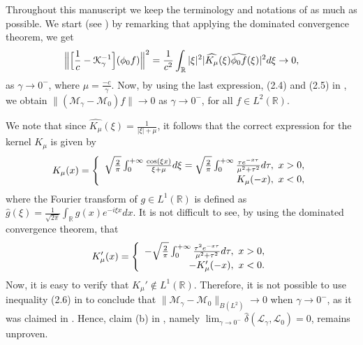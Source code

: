 \documentclass[10pt,reqno]{amsart}
\numberwithin{equation}{section}
\begin{document}

Throughout this manuscript we keep the terminology and notations of 
\cite{am:am} as much as possible.  We start (see \cite[Lemma 2.4, p. 188]{am:am})  
by remarking that applying the dominated convergence theorem, we get
\begin{equation*}
 \Big{\|}\Big{[}\frac{1}{c}-\mathcal{K}_{\gamma}^{-1}\Big{]} (\phi_0 f) 
 \Big{\|}^2 = \frac{1}{c^2} \int_{\mathbb{R}} |\xi|^2
 |\widehat{K_{\mu}}(\xi) \widehat{\phi_0 f}(\xi)|^2 d\xi 
 \rightarrow 0,
\end{equation*}
as $\gamma \rightarrow 0^-$, where $\mu=\frac{-c}{\gamma}$.   Now, by 
using the last expression, (2.4) and (2.5) in \cite{am:am}, we obtain   
$\|(\mathcal{M}_{\gamma}-\mathcal{M}_0)f\|\rightarrow 0$ as 
$\gamma \rightarrow 0^{-}$, for all $f \in L^2(\mathbb{R})$.

We note that since  $\widehat{K_{\mu}}(\xi)=\frac{1}{|\xi|+\mu}$, 
it follows that the correct expression for the kernel $K_{\mu}$ is 
given by 
\begin{equation*}
 K_{\mu}(x)  =\left\{
  \begin{array}
  [c]{r}
  \sqrt{\frac{2}{\pi}} \int_0^{+\infty}\frac{\cos(\xi x)}
  {\xi+\mu} d\xi =
  \sqrt{\frac{2}{\pi}} \int_0^{+\infty}\frac{\tau e^{-x\tau}}
  {\mu^2+\tau^2}d\tau,\text{ }x>0,\\
  K_{\mu}(-x),\text{ }x<0,
  \end{array}
\right.
\end{equation*}
where the Fourier transform of $g \in L^1(\mathbb{R})$ is 
defined as $\hat g(\xi)=\frac{1}{\sqrt{2\pi}}\int_{\mathbb{R}} 
g(x)e^{-i\xi x}dx$.  
It is not difficult to see, by using the dominated convergence theorem, 
that 
\begin{equation*}
 K_{\mu}'(x)  =\left\{
  \begin{array}
  [c]{r}
  -\sqrt{\frac{2}{\pi}} \int_0^{+\infty}\frac{\tau^2 e^{-x\tau}}
  {\mu^2+\tau^2}d\tau,\text{ }x>0,\\
  -K_{\mu}'(-x),\text{ }x<0.
  \end{array}
\right.
\end{equation*}
Now, it is easy to verify that $K_{\mu}'\notin L^1(\mathbb{R})$.  Therefore, 
it is not possible to  use inequality (2.6) in \cite{am:am} to conclude that 
$\|\mathcal{M}_{\gamma}-\mathcal{M}_0\|_{B(L^2)}\rightarrow 0$ when  
$\gamma \rightarrow 0^{-}$, as it was claimed in \cite{am:am}.   Hence, claim 
(b) in \cite[Lemma 2.4, p. 187]{am:am}, namely 
$\lim_{\gamma \rightarrow 0^-}\hat \delta(\mathcal{L}_{\gamma}, 
\mathcal{L}_0)=0$, remains unproven.
\end{document}
